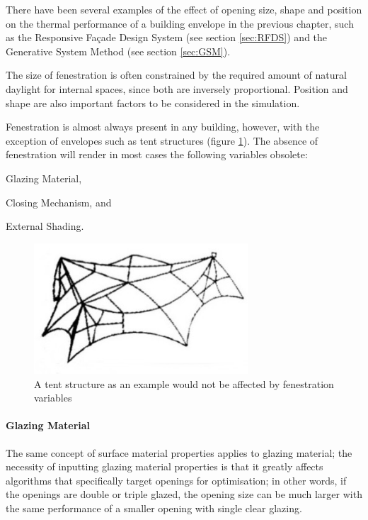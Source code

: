 There have been several examples of the effect of opening size, shape and position on the thermal performance of a building envelope in the previous chapter, such as the Responsive Fa\c{c}ade Design System (see section \ref{sec:RFDS}) and the Generative System Method (see section \ref{sec:GSM}).

The size of fenestration is often constrained by the required amount of natural daylight for internal spaces, since both are inversely proportional. Position and shape are also important factors to be considered in the simulation.

Fenestration is almost always present in any building, however, with the exception of envelopes such as tent structures (figure \ref{fig:tent}). The absence of fenestration will render in most cases the following variables obsolete: \begin{inparaenum} \item Glazing Material, \item Closing Mechanism, and \item External Shading.\end{inparaenum}

\begin{figure}[H]
	\centering
	\includegraphics[width=8cm]{./Images/8-Tent}
	\caption[Tent Structure]{A tent structure as an example would not be affected by fenestration variables}
	\label{fig:tent}
\end{figure}
\paragraph{Glazing Material}\mbox{}

The same concept of surface material properties applies to glazing material; the necessity of inputting glazing material properties is that it greatly affects algorithms that specifically target openings for optimisation; in other words, if the openings are double or triple glazed, the opening size can be much larger with the same performance of a smaller opening with single clear glazing.

